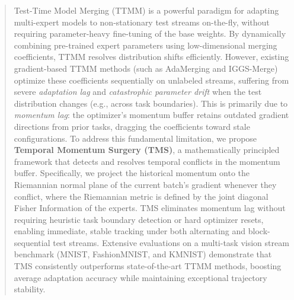 \documentclass{article}
\theoremstyle{plain}
\theoremstyle{definition}
\theoremstyle{remark}
\begin{document}

\printAffiliationsAndNotice{}

\begin{abstract}
  Test-Time Model Merging (TTMM) is a powerful paradigm for adapting multi-expert models to non-stationary test streams on-the-fly, without requiring parameter-heavy fine-tuning of the base weights. By dynamically combining pre-trained expert parameters using low-dimensional merging coefficients, TTMM resolves distribution shifts efficiently. However, existing gradient-based TTMM methods (such as AdaMerging and IGGS-Merge) optimize these coefficients sequentially on unlabeled streams, suffering from severe \emph{adaptation lag} and \emph{catastrophic parameter drift} when the test distribution changes (e.g., across task boundaries). This is primarily due to \emph{momentum lag}: the optimizer's momentum buffer retains outdated gradient directions from prior tasks, dragging the coefficients toward stale configurations. To address this fundamental limitation, we propose \textbf{Temporal Momentum Surgery (TMS)}, a mathematically principled framework that detects and resolves temporal conflicts in the momentum buffer. Specifically, we project the historical momentum onto the Riemannian normal plane of the current batch's gradient whenever they conflict, where the Riemannian metric is defined by the joint diagonal Fisher Information of the experts. TMS eliminates momentum lag without requiring heuristic task boundary detection or hard optimizer resets, enabling immediate, stable tracking under both alternating and block-sequential test streams. Extensive evaluations on a multi-task vision stream benchmark (MNIST, FashionMNIST, and KMNIST) demonstrate that TMS consistently outperforms state-of-the-art TTMM methods, boosting average adaptation accuracy while maintaining exceptional trajectory stability.
\end{abstract}
\end{document}
